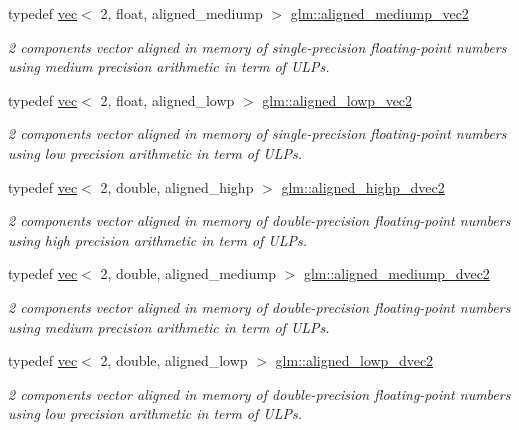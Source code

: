 \begin{DoxyCompactItemize}
typedef \mbox{\hyperlink{structglm_1_1vec}{vec}}$<$ 2, float, aligned\+\_\+mediump $>$ \mbox{\hyperlink{group__gtc__type__aligned_ga96e85f0817c2c6734af6c981ce2b3940}{glm\+::aligned\+\_\+mediump\+\_\+vec2}}
\begin{DoxyCompactList}\small\item\em 2 components vector aligned in memory of single-\/precision floating-\/point numbers using medium precision arithmetic in term of U\+L\+Ps. \end{DoxyCompactList}\item 
typedef \mbox{\hyperlink{structglm_1_1vec}{vec}}$<$ 2, float, aligned\+\_\+lowp $>$ \mbox{\hyperlink{group__gtc__type__aligned_ga10048e69ffac79ec5ea059398485114e}{glm\+::aligned\+\_\+lowp\+\_\+vec2}}
\begin{DoxyCompactList}\small\item\em 2 components vector aligned in memory of single-\/precision floating-\/point numbers using low precision arithmetic in term of U\+L\+Ps. \end{DoxyCompactList}\item 
typedef \mbox{\hyperlink{structglm_1_1vec}{vec}}$<$ 2, double, aligned\+\_\+highp $>$ \mbox{\hyperlink{group__gtc__type__aligned_gadc0edec95aa740d8ec351ef1e2dd39de}{glm\+::aligned\+\_\+highp\+\_\+dvec2}}
\begin{DoxyCompactList}\small\item\em 2 components vector aligned in memory of double-\/precision floating-\/point numbers using high precision arithmetic in term of U\+L\+Ps. \end{DoxyCompactList}\item 
typedef \mbox{\hyperlink{structglm_1_1vec}{vec}}$<$ 2, double, aligned\+\_\+mediump $>$ \mbox{\hyperlink{group__gtc__type__aligned_gab67579d5dcc90f9e4ab28cc92a467eee}{glm\+::aligned\+\_\+mediump\+\_\+dvec2}}
\begin{DoxyCompactList}\small\item\em 2 components vector aligned in memory of double-\/precision floating-\/point numbers using medium precision arithmetic in term of U\+L\+Ps. \end{DoxyCompactList}\item 
typedef \mbox{\hyperlink{structglm_1_1vec}{vec}}$<$ 2, double, aligned\+\_\+lowp $>$ \mbox{\hyperlink{group__gtc__type__aligned_ga82d3a1058d43fa4547f56e8d5c7fb5ca}{glm\+::aligned\+\_\+lowp\+\_\+dvec2}}
\begin{DoxyCompactList}\small\item\em 2 components vector aligned in memory of double-\/precision floating-\/point numbers using low precision arithmetic in term of U\+L\+Ps. \end{DoxyCompactList}\item 

\end{DoxyCompactItemize}
